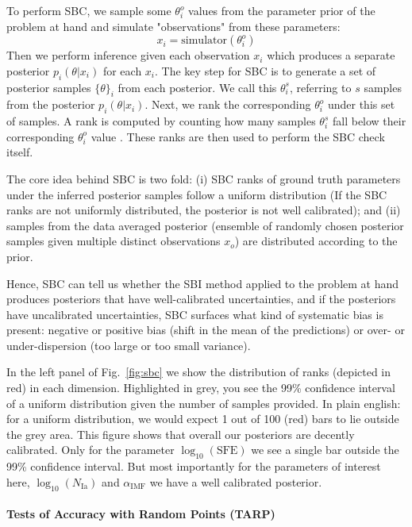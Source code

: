 \documentclass{aa}
\begin{document}
\begin{appendix}
To perform SBC, we sample some $\theta_i^o$ values from the parameter prior of the problem at hand and simulate "observations" from these parameters: 
\begin{equation}
    x_i = \text{simulator}(\theta_i^o)
\end{equation}
Then we perform inference given each observation $x_i$ which produces a separate posterior $p_i(\theta|x_i)$ for each $x_i$. The key step for SBC is to generate a set of posterior samples $\{\theta\}_i$ from each posterior. We call this $\theta_i^s$, referring to $s$ samples from the posterior $p_i(\theta|x_i)$. Next, we rank the corresponding $\theta_i^o$ under this set of samples. A rank is computed by counting how many samples $\theta_i^s$ fall below their corresponding $\theta_i^o$ value \citep[see section 4.1 in][]{Talts2018}. These ranks are then used to perform the SBC check itself.

The core idea behind SBC is two fold: (i) SBC ranks of ground truth parameters under the inferred posterior samples follow a uniform distribution (If the SBC ranks are not uniformly distributed, the posterior is not well calibrated); and (ii) samples from the data averaged posterior (ensemble of randomly chosen posterior samples given multiple distinct observations $x_o$) are distributed according to the prior.

Hence, SBC can tell us whether the SBI method applied to the problem at hand produces posteriors that have well-calibrated uncertainties, and if the posteriors have uncalibrated uncertainties, SBC surfaces what kind of systematic bias is present: negative or positive bias (shift in the mean of the predictions) or over- or under-dispersion (too large or too small variance).

In the left panel of Fig.~\ref{fig:sbc} we show the distribution of ranks (depicted in red) in each dimension. Highlighted in grey, you see the 99\% confidence interval of a uniform distribution given the number of samples provided. In plain english: for a uniform distribution, we would expect 1 out of 100 (red) bars to lie outside the grey area. This figure shows that overall our posteriors are decently calibrated. Only for the parameter $\log_{10}\left(\mathrm{SFE}\right)$ we see a single bar outside the 99\% confidence interval. But most importantly for the parameters of interest here, $\log_{10}\left(N_\mathrm{Ia}\right)$ and $\alpha_\mathrm{IMF}$ we have a well calibrated posterior.

\paragraph{Tests of Accuracy with Random Points (TARP)}


\end{appendix}
\end{document}
